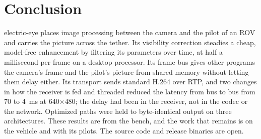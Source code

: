 \section{Conclusion}\label{sec:conclusion}

electric-eye places image processing between the camera and the pilot
of an ROV and
carries the picture across the tether. Its visibility correction
steadies a cheap,
model-free enhancement by filtering its parameters over time, at half
a millisecond
per frame on a desktop processor. Its frame bus gives other programs
the camera's
frame and the pilot's picture from shared memory without letting them
delay either.
Its transport sends standard H.264 over RTP, and two changes in how
the receiver is
fed and threaded reduced the latency from bus to bus from 70 to 4~ms at
640$\times$480; the delay had been in the receiver, not in the codec
or the network.
Optimized paths were held to byte-identical output on three architectures. These
results are from the bench, and the work that remains is on the
vehicle and with its
pilots. The source code and release binaries are open.
